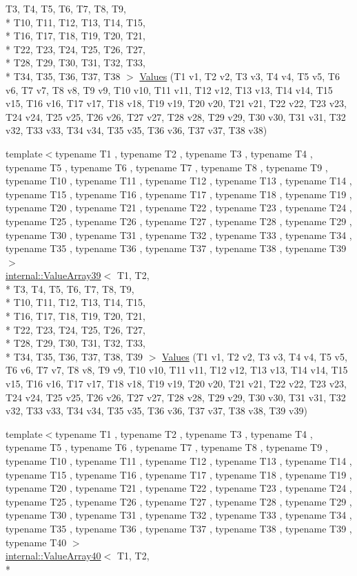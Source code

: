 \begin{DoxyCompactItemize}
T3, T4, T5, T6, T7, T8, T9, \\*
T10, T11, T12, T13, T14, T15, \\*
T16, T17, T18, T19, T20, T21, \\*
T22, T23, T24, T25, T26, T27, \\*
T28, T29, T30, T31, T32, T33, \\*
T34, T35, T36, T37, T38 $>$ \hyperlink{namespacetesting_aabc33ee31d17eb0b0bed3401d62266d9}{Values} (T1 v1, T2 v2, T3 v3, T4 v4, T5 v5, T6 v6, T7 v7, T8 v8, T9 v9, T10 v10, T11 v11, T12 v12, T13 v13, T14 v14, T15 v15, T16 v16, T17 v17, T18 v18, T19 v19, T20 v20, T21 v21, T22 v22, T23 v23, T24 v24, T25 v25, T26 v26, T27 v27, T28 v28, T29 v29, T30 v30, T31 v31, T32 v32, T33 v33, T34 v34, T35 v35, T36 v36, T37 v37, T38 v38)
\item 
{\footnotesize template$<$typename T1 , typename T2 , typename T3 , typename T4 , typename T5 , typename T6 , typename T7 , typename T8 , typename T9 , typename T10 , typename T11 , typename T12 , typename T13 , typename T14 , typename T15 , typename T16 , typename T17 , typename T18 , typename T19 , typename T20 , typename T21 , typename T22 , typename T23 , typename T24 , typename T25 , typename T26 , typename T27 , typename T28 , typename T29 , typename T30 , typename T31 , typename T32 , typename T33 , typename T34 , typename T35 , typename T36 , typename T37 , typename T38 , typename T39 $>$ }\\\hyperlink{classtesting_1_1internal_1_1ValueArray39}{internal\-::\-Value\-Array39}$<$ T1, T2, \\*
T3, T4, T5, T6, T7, T8, T9, \\*
T10, T11, T12, T13, T14, T15, \\*
T16, T17, T18, T19, T20, T21, \\*
T22, T23, T24, T25, T26, T27, \\*
T28, T29, T30, T31, T32, T33, \\*
T34, T35, T36, T37, T38, T39 $>$ \hyperlink{namespacetesting_aba3a6a2dcb9660c6ccb1d867c7a137ee}{Values} (T1 v1, T2 v2, T3 v3, T4 v4, T5 v5, T6 v6, T7 v7, T8 v8, T9 v9, T10 v10, T11 v11, T12 v12, T13 v13, T14 v14, T15 v15, T16 v16, T17 v17, T18 v18, T19 v19, T20 v20, T21 v21, T22 v22, T23 v23, T24 v24, T25 v25, T26 v26, T27 v27, T28 v28, T29 v29, T30 v30, T31 v31, T32 v32, T33 v33, T34 v34, T35 v35, T36 v36, T37 v37, T38 v38, T39 v39)
\item 
{\footnotesize template$<$typename T1 , typename T2 , typename T3 , typename T4 , typename T5 , typename T6 , typename T7 , typename T8 , typename T9 , typename T10 , typename T11 , typename T12 , typename T13 , typename T14 , typename T15 , typename T16 , typename T17 , typename T18 , typename T19 , typename T20 , typename T21 , typename T22 , typename T23 , typename T24 , typename T25 , typename T26 , typename T27 , typename T28 , typename T29 , typename T30 , typename T31 , typename T32 , typename T33 , typename T34 , typename T35 , typename T36 , typename T37 , typename T38 , typename T39 , typename T40 $>$ }\\\hyperlink{classtesting_1_1internal_1_1ValueArray40}{internal\-::\-Value\-Array40}$<$ T1, T2, \\*

\end{DoxyCompactItemize}
